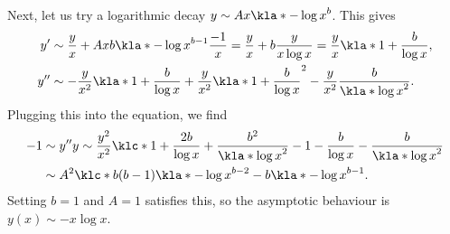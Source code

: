 \documentclass[english, parskip=full]{scrbook}
\begin{document}
Next, let us try a logarithmic decay $y\sim Ax \kla*{-\log x}^b$.
This gives
\begin{align}
y' &\sim \frac{y}{x} + Ax b \kla*{-\log x}^{b-1} \frac{-1}{x} = \frac{y}{x} + b\frac{y}{x\log x} = \frac{y}{x} \kla*{1 + \frac{b}{\log x}},\\
y'' &\sim -\frac{y}{x^2} \kla*{1 + \frac{b}{\log x}} + \frac{y}{x^2} \kla*{1 + \frac{b}{\log x}}^2 - \frac{y}{x^2} \frac{b}{\kla*{\log x}^2}.
\end{align}
Plugging this into the equation, we find
\begin{align}
-1 &\sim y'' y \sim \frac{y^2}{x^2} \klc*{1 + \frac{2b}{\log x} + \frac{b^2}{\kla*{\log x}^2} - 1 - \frac{b}{\log x} - \frac{b}{\kla*{\log x}^2}}\\
&\sim A^2 \klc*{b(b-1) \kla*{-\log x}^{b-2} - b\kla*{-\log x}^{b-1}}.
\end{align}
Setting $b=1$ and $A=1$ satisfies this, so the asymptotic behaviour is $y(x) \sim -x\log x$.
\end{document}
